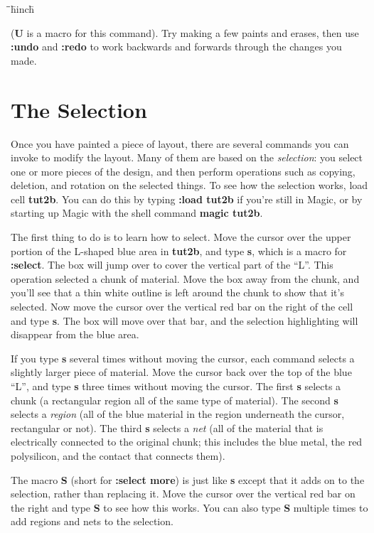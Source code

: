 \documentclass[letterpaper,twoside,12pt]{article}
\def\hinch{\hspace*{0.5in}}
\def\starti{\begin{center}\begin{tabbing}\hinch\=\hinch\=\hinch\=hinch\=\kill}
\def\endi{\end{tabbing}\end{center}}
\def\ii{\>\>\>}
\begin{document}
\starti
   \ii {\bfseries :redo}
\endi

({\bfseries U} is a macro for this command).  Try making a few paints
and erases, then use {\bfseries :undo} and {\bfseries :redo} to work
backwards and forwards through the changes you made.

\section{The Selection}

Once you have painted a piece of layout, there are several commands
you can invoke to modify the layout.  Many of them are based on
the {\itshape selection}:  you select one or more pieces of the design,
and then perform operations such as copying, deletion, and rotation
on the selected things.
To see how the selection works, load cell {\bfseries tut2b}.  You
can do this by typing {\bfseries :load tut2b} if you're still in Magic,
or by starting up Magic with the shell command {\bfseries magic tut2b}.

The first thing to do is to learn how to select.
Move the cursor over the upper portion of the
L-shaped blue area in {\bfseries tut2b}, and type {\bfseries s}, which
is a macro for {\bfseries :select}.  The box
will jump over to cover the vertical part of the ``L''.  This
operation selected a chunk of material.  Move the box away from
the chunk, and you'll see that a thin white outline is left
around the chunk to show that it's selected.  Now move the cursor
over the vertical red bar on the right of the cell and type {\bfseries s}.
The box will move over that bar, and the selection highlighting will
disappear from the blue area.

If you type {\bfseries s} several times without moving the cursor,
each command selects a slightly larger piece of material.  Move the
cursor back over the top of the blue ``L'', and type {\bfseries s} three
times without moving the cursor.  The first {\bfseries s} selects a
chunk (a rectangular region all of the same type of material).  The
second {\bfseries s} selects a {\itshape region} (all of the
blue material in the region underneath the cursor, rectangular or not).
The third {\bfseries s} selects a {\itshape net} (all of the material that is
electrically connected to the original chunk; this includes the
blue metal, the red polysilicon, and the contact that connects them).

The macro {\bfseries S} (short for {\bfseries :select more}) is just like {\bfseries s}
except that it adds on to the selection, rather than replacing it.
Move the cursor over the vertical red bar on the right
and type {\bfseries S} to see how this works.  You can also type {\bfseries S}
multiple times to add regions and nets to the selection.
\end{document}
